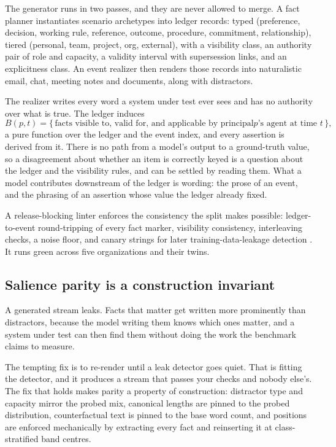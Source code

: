 \documentclass[11pt]{article}
\begin{document}
The generator runs in two passes, and they are never allowed to merge. A fact
planner instantiates scenario archetypes into ledger records: typed
(preference, decision, working rule, reference, outcome, procedure,
commitment, relationship), tiered (personal, team, project, org, external),
with a visibility class, an authority pair of role and capacity, a validity
interval with supersession links, and an explicitness class. An event realizer
then renders those records into naturalistic email, chat, meeting notes and
documents, along with distractors.

The realizer writes every word a system under test ever sees and has no
authority over what is true. The ledger induces
\[
B(p,t) = \{\,\text{facts visible to, valid for, and applicable by principal
$p$'s agent at time $t$}\,\},
\]
a pure function over the ledger and the event index, and every assertion is
derived from it. There is no path from a model's output to a ground-truth
value, so a disagreement about whether an item is correctly keyed is a
question about the ledger and the visibility rules, and can be settled by
reading them. What a model contributes downstream of the ledger is wording:
the prose of an event, and the phrasing of an assertion whose value the ledger
already fixed.

A release-blocking linter enforces the consistency the split makes possible:
ledger-to-event round-tripping of every fact marker, visibility consistency,
interleaving checks, a noise floor, and canary strings for later
training-data-leakage detection \cite{gsm1k}. It runs green across five
organizations and their twins.

\subsection{Salience parity is a construction invariant}

A generated stream leaks. Facts that matter get written more prominently than
distractors, because the model writing them knows which ones matter, and a
system under test can then find them without doing the work the benchmark
claims to measure.

The tempting fix is to re-render until a leak detector goes quiet. That is
fitting the detector, and it produces a stream that passes your checks and
nobody else's. The fix that holds makes parity a property of construction:
distractor type and capacity mirror the probed mix, canonical lengths are
pinned to the probed distribution, counterfactual text is pinned to the base
word count, and positions are enforced mechanically by extracting every fact
and reinserting it at class-stratified band centres.
\end{document}
